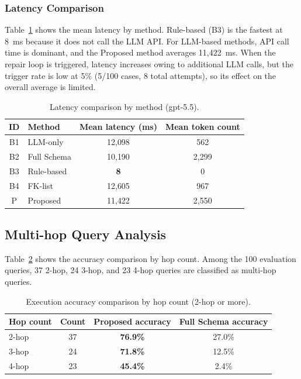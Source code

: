 \documentclass[5p,twocolumn]{elsarticle}
\begin{document}
\subsubsection{Latency Comparison}
\label{sec:scalability}

Table~\ref{tab:latency} shows the mean latency by method.
Rule-based (B3) is the fastest at 8~ms because it does not call the LLM API.
For LLM-based methods, API call time is dominant,
and the Proposed method averages 11{,}422~ms.
When the repair loop is triggered, latency increases owing to additional LLM calls,
but the trigger rate is low at 5\% (5/100 cases, 8 total attempts), so its effect on the overall average is limited.

\begin{table}[htbp]
  \centering
  \caption{Latency comparison by method (gpt-5.5).}
  \label{tab:latency}
  \small
  \begin{tabular}{clcc}
    \toprule
    ID & Method & Mean latency (ms) & Mean token count \\
    \midrule
    B1 & LLM-only & 12{,}098 & 562 \\
    B2 & Full Schema & 10{,}190 & 2{,}299 \\
    B3 & Rule-based & \textbf{8} & 0 \\
    B4 & FK-list & 12{,}605 & 967 \\
    P & Proposed & 11{,}422 & 2{,}550 \\
    \bottomrule
  \end{tabular}
\end{table}

\subsection{Multi-hop Query Analysis}
\label{sec:multihop}

Table~\ref{tab:multihop} shows the accuracy comparison by hop count.
Among the 100 evaluation queries, 37 2-hop, 24 3-hop, and 23 4-hop queries
are classified as multi-hop queries.

\begin{table}[htbp]
  \centering
  \caption{Execution accuracy comparison by hop count (2-hop or more).}
  \label{tab:multihop}
  \small
  \begin{tabular}{lccc}
    \toprule
    Hop count & Count & Proposed accuracy & Full Schema accuracy \\
    \midrule
    2-hop & 37 & \textbf{76.9\%} & 27.0\% \\
    3-hop & 24 & \textbf{71.8\%} & 12.5\% \\
    4-hop & 23 & \textbf{45.4\%} & 2.4\% \\
    \bottomrule
  \end{tabular}
\end{table}
\end{document}
